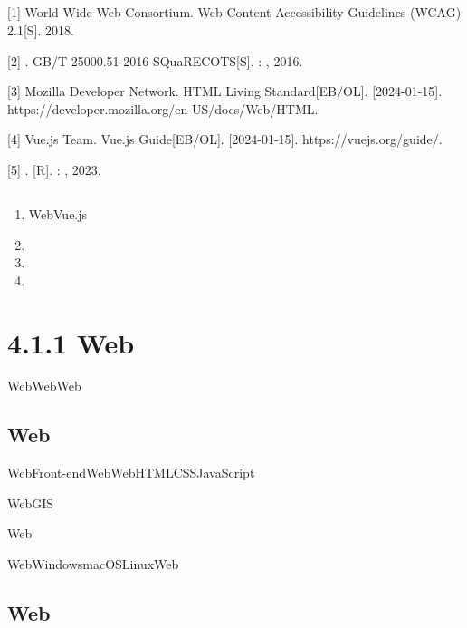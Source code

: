 \hypertarget{section-8}{%
\subsection{}\label{section-8}}

{[}1{]} World Wide Web Consortium. Web Content Accessibility Guidelines
(WCAG) 2.1{[}S{]}. 2018.

{[}2{]} . GB/T 25000.51-2016 SQuaRECOTS{[}S{]}. : , 2016.

{[}3{]} Mozilla Developer Network. HTML Living Standard{[}EB/OL{]}.
{[}2024-01-15{]}. https://developer.mozilla.org/en-US/docs/Web/HTML.

{[}4{]} Vue.js Team. Vue.js Guide{[}EB/OL{]}. {[}2024-01-15{]}.
https://vuejs.org/guide/.

{[}5{]} . {[}R{]}. : , 2023.

\hypertarget{section-9}{%
\subsection{}\label{section-9}}

\begin{enumerate}
\def\labelenumi{\arabic{enumi}.}
\item
  \important{}WebVue.js
\item
  \important{}
\item
  \important{}
\item
  \important{}
\end{enumerate}

\hypertarget{web}{%
\section{4.1.1 Web}\label{web}}

WebWebWeb

\hypertarget{web-1}{%
\subsection{Web}\label{web-1}}

WebFront-endWebWebHTMLCSSJavaScript

WebGIS

\important{} Web

WebWindowsmacOSLinuxWeb

\hypertarget{web-2}{%
\subsection{Web}\label{web-2}}

